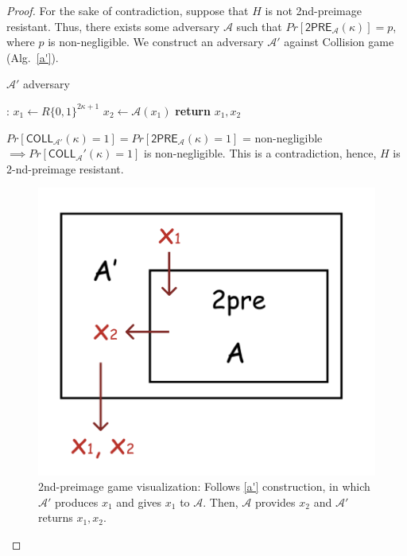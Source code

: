 \begin{proof}
For the sake of contradiction, suppose that $H$ is not 2nd-preimage resistant. Thus, there exists some adversary $\mathcal{A}$ such that $Pr[\mathsf{2PRE}_{\mathcal{A}}(\kappa)] = p$, where $p$ is non-negligible. We construct an adversary $\mathcal{A'}$ against Collision game (Alg.~\ref{a'}).

\begin{algorithm}
\caption{$\mathcal{A
}'$ adversary}
\label{a'}
\begin{algorithmic}[1]
:
    \State $x_1 \leftarrow R \{0,1\}^{2\kappa+1}$
    \State $x_2 \leftarrow \mathcal{A}(x_1)$
    \State \textbf{return} $x_1, x_2$
\EndFunction
\end{algorithmic}
\end{algorithm}

$Pr[\mathsf{COLL}_{\mathcal{A}'}(\kappa)=1] = Pr[\mathsf{2PRE}_{\mathcal{A}}(\kappa)=1]$ = non-negligible
$\implies Pr[\mathsf{COLL}_\mathcal{A}'(\kappa)=1]$ is non-negligible.
This is a contradiction, hence, $H$ is 2-nd-preimage resistant.

\begin{figure}[H]
    \centering
    \includegraphics[scale=0.6]{figures/2pre.png}
    \caption{2nd-preimage game visualization: Follows \ref{a'} construction, in which $\mathcal{A}'$ produces $x_1$ and gives $x_1$ to $\mathcal{A}$. Then, $\mathcal{A}$ provides $x_2$ and $\mathcal{A}'$ returns $x_1, x_2$.}
    \label{fig:2pre_viz}
\end{figure}

\end{proof}

